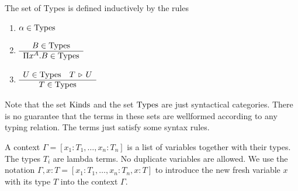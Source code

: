 \documentclass[12pt]{article}
\begin{document}
\begin{definition}
  The set of Types is defined inductively by the rules
  \begin{enumerate}

  \item $\alpha \in \text{Types}$

  \item $\begin{array}{c} B \in \text{Types} \\ \hline \Pi x^A.B \in \text{Types}\end{array}$

  \item $\begin{array}{c} U \in \text{Types} \quad T \,\triangleright\, U \\ \hline T \in \text{Types}\end{array}$
  \end{enumerate}

\end{definition}

Note that the set $\text{Kinds}$ and the set $\text{Types}$ are just syntactical
categories. There is no guarantee that the terms in these sets are wellformed
according to any typing relation. The terms just satisfy some syntax rules.


\begin{definition}
  A context $\Gamma = [x_1:T_1, \ldots, x_n:T_n]$ is a list of variables
  together with their types. The types $T_i$ are lambda terms. No duplicate
  variables are allowed. We use the notation
  $\Gamma,x:T = [x_1:T_1, \ldots, x_n:T_n, x:T]$ to introduce the new fresh
  variable $x$ with its type $T$ into the context $\Gamma$.
\end{definition}
\end{document}

